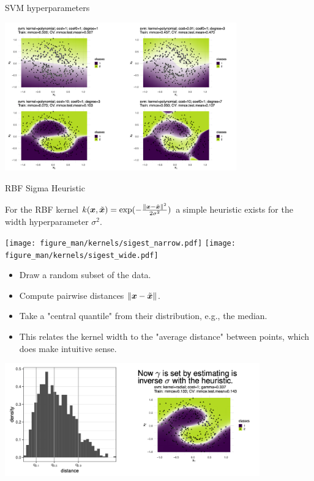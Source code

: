 \begin{vbframe}{SVM hyperparameters}
\begin{center}
\includegraphics[width = 10cm ]{figure_man/margin-violating_Polynom.png}
\end{center}

\end{vbframe}


\begin{vbframe}{RBF Sigma Heuristic}

For the RBF kernel $k(\bm{x}, \tilde {\bm{x}}) = \exp(-\frac{\|\bm{x} - \tilde {\bm{x}} \|^2}{2\sigma^2})$ a simple heuristic exists for the width hyperparameter $\sigma^2$. 

\lz


\begin{center}
  \texttt{[image: figure\_man/kernels/sigest\_narrow.pdf]}
  \texttt{[image: figure\_man/kernels/sigest\_wide.pdf]}
\end{center}  
\begin{footnotesize} 

\end{footnotesize}


\framebreak


\begin{itemize}
  \item Draw a random subset of the data.
  \item Compute pairwise distances $\|\bm{x} - \tilde {\bm{x}} \|$.
  \item Take a "central quantile" from their distribution, e.g., the median.
  \item This relates the kernel width to the "average distance" between points,
    which does make intuitive sense.
\end{itemize}

\begin{center}
\includegraphics[width = 11cm ]{figure_man/rbf_sigma.png}
\end{center}


\framebreak

\end{vbframe}

